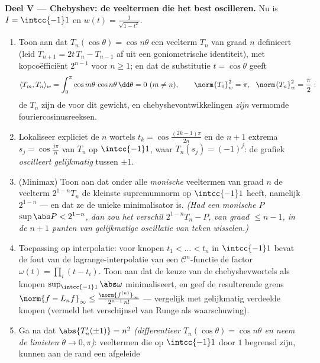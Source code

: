 \begin{problem}
\medskip
\noindent\textbf{Deel V --- Chebyshev: de veeltermen die het
best oscilleren.} Nu is $I = \intcc{-1}1$ en $w(t) =
\frac1{\sqrt{1 - t^2}}$.
\begin{enumerate}[resume]
  \item Toon aan dat $T_n(\cos\theta) = \cos n\theta$ een
        veelterm $T_n$ van graad $n$ definieert (leid $T_{n+1} =
        2t\,T_n - T_{n-1}$ af uit een goniometrische identiteit),
        met kopcoëfficiënt $2^{n-1}$ voor $n \geq 1$; en dat de
        substitutie $t = \cos\theta$ geeft
        \[
        \langle T_m, T_n\rangle_w =
        \int_0^\pi\cos m\theta\,\cos n\theta\,\dd\theta
        = 0 \ (m \neq n), \qquad
        \norm{T_0}_w^2 = \pi,\ \ \norm{T_n}_w^2 = \frac\pi2 :
        \]
        de $T_n$ zijn de  voor dit gewicht,
        en chebyshevontwikkelingen \emph{zijn} vermomde
        fouriercosinusreeksen.
  \item Lokaliseer expliciet de $n$ wortels $t_k =
        \cos\frac{(2k-1)\pi}{2n}$ en de $n + 1$ extrema $s_j =
        \cos\frac{j\pi}n$ van $T_n$ op $\intcc{-1}1$, waar
        $T_n(s_j) = (-1)^j$: de grafiek \emph{oscilleert
        gelijkmatig} tussen $\pm1$.
  \item (Minimax) Toon aan dat onder alle \emph{monische}
        veeltermen van graad $n$ de veelterm $2^{1-n}T_n$ de
        kleinste supremumnorm op $\intcc{-1}1$ heeft, namelijk
        $2^{1-n}$ --- en dat ze de unieke minimalisator is.
        \emph{(Had een monische $P$ $\sup\abs P < 2^{1-n}$, dan
        zou het verschil $2^{1-n}T_n - P$, van graad $\leq n-1$,
        in de $n+1$ punten van gelijkmatige oscillatie van teken
        wisselen.)}
  \item Toepassing op interpolatie: voor knopen $t_1 < \dots <
        t_n$ in $\intcc{-1}1$ bevat de fout van de
        lagrange-interpolatie van een $\mathcal C^n$-functie de
        factor $\omega(t) = \prod_i(t - t_i)$. Toon aan dat de
        keuze van de chebyshevwortels als knopen
        $\sup_{\intcc{-1}1}\abs\omega$ minimaliseert, en geef de
        resulterende grens $\norm{f - L_nf}_\infty \leq
        \frac{\norm{f^{(n)}}_\infty} {2^{n-1}\,n!}$ ---
        vergelijk met gelijkmatig verdeelde knopen (vermeld het
        verschijnsel van Runge als waarschuwing).
  \item Ga na dat $\abs{T_n'(\pm1)} = n^2$ \emph{(differentieer
        $T_n(\cos\theta) = \cos n\theta$ en neem de limieten
        $\theta \to 0, \pi$)}: veeltermen die op $\intcc{-1}1$
        door $1$ begrensd zijn, kunnen aan de rand een afgeleide

\end{enumerate}
\end{problem}
